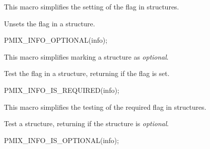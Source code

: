\begin{arglist}
\end{arglist}

This macro simplifies the setting of the  flag in  structures.


Unsets the  flag in a  structure.

\cspecificstart
\begin{codepar}
PMIX_INFO_OPTIONAL(info);
\end{codepar}
\cspecificend

\begin{arglist}
\end{arglist}

This macro simplifies marking a  structure as \textit{optional}.


Test the  flag in a  structure, returning  if the flag is set.

\cspecificstart
\begin{codepar}
PMIX_INFO_IS_REQUIRED(info);
\end{codepar}
\cspecificend

\begin{arglist}
\end{arglist}

This macro simplifies the testing of the required flag in  structures.


Test a  structure, returning  if the structure is \textit{optional}.

\cspecificstart
\begin{codepar}
PMIX_INFO_IS_OPTIONAL(info);
\end{codepar}
\cspecificend

